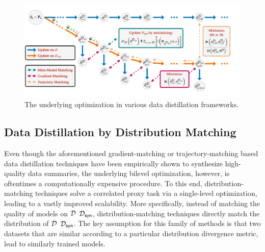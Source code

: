 \documentclass[10pt]{article} %
\begin{document}
\begin{figure}[t!] \centering
    \centering
    \includegraphics[width=0.9\linewidth]{figures/optimization.pdf}
    \renewcommand\figurename{\href{https://www.noveens.com/images/dd_survey/optimization.pdf}{[HQ Image Link]} Figure}
    \vspace{-10pt}
    \caption{The underlying optimization in various data distillation frameworks.}
    \label{fig:pictorial_gradients}
\end{figure} 

\subsection{Data Distillation by Distribution Matching} \label{sec:distr_matching}
Even though the aforementioned gradient-matching or trajectory-matching based data distillation techniques have been empirically shown to synthesize high-quality data summaries, the underlying bilevel optimization, however, is oftentimes a computationally expensive procedure. To this end, distribution-matching techniques solve a correlated proxy task via a single-level optimization, leading to a vastly improved scalability. More specifically, instead of matching the quality of models on $\mathcal{D}$ \vs $\mathcal{D}_{\mathsf{syn}}$, distribution-matching techniques directly match the distribution of $\mathcal{D}$ \vs $\mathcal{D}_{\mathsf{syn}}$. The key assumption for this family of methods is that two datasets that are similar according to a particular distribution divergence metric, lead to similarly trained models.
\end{document}
